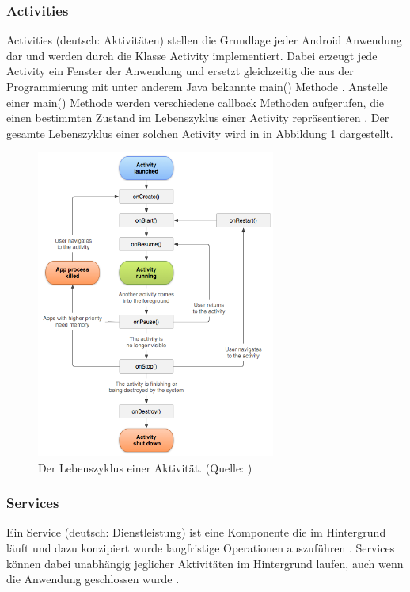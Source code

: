 \subsubsection{Activities}
Activities (deutsch: \glqq Aktivitäten\grqq ) stellen die Grundlage jeder Android Anwendung dar und werden durch die Klasse Activity implementiert. Dabei erzeugt jede Activity ein Fenster der Anwendung und ersetzt gleichzeitig die aus der Programmierung mit unter anderem Java bekannte main() Methode \citep{android:activities}. Anstelle einer main() Methode werden verschiedene callback Methoden aufgerufen, die einen bestimmten Zustand im Lebenszyklus einer Activity repräsentieren \citep{android:activities}. Der gesamte Lebenszyklus einer solchen Activity wird in in Abbildung \ref{fig:activity-lifecycle} dargestellt. 
\begin{figure}[h!]
\centering
\includegraphics[width=0.7\textwidth]{Abbildungen/activity-lifecycle.png}
\caption[Lebenszyklus einer Aktivität]{Der Lebenszyklus einer Aktivität. (Quelle: \citet{android:activity-lifecycle})}
\label{fig:activity-lifecycle}
\end{figure}

\subsubsection{Services}
Ein Service (deutsch: \glqq Dienstleistung\grqq ) ist eine Komponente die im Hintergrund läuft und dazu konzipiert wurde langfristige Operationen auszuführen \citep{android:fundamentals}. Services können dabei unabhängig jeglicher Aktivitäten im Hintergrund laufen, auch wenn die Anwendung geschlossen wurde \citep{murphy:beginning-android}.

